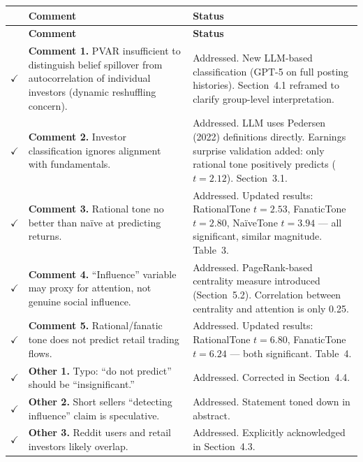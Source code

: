 \documentclass[11pt]{article}
\newcommand{\done}{\textcolor{done}{$\checkmark$}}
\begin{document}
\begin{longtable}{p{} p{} p{}}
\toprule
& \textbf{Comment} & \textbf{Status} \\
\midrule
\endfirsthead
\toprule
& \textbf{Comment} & \textbf{Status} \\
\midrule
\endhead
\bottomrule
\endfoot

\done & \textbf{Comment 1.} PVAR insufficient to distinguish belief spillover from autocorrelation of individual investors (dynamic reshuffling concern). &
  Addressed. New LLM-based classification (GPT-5 on full posting histories). Section~4.1 reframed to clarify group-level interpretation. \\[6pt]

\done & \textbf{Comment 2.} Investor classification ignores alignment with fundamentals. &
  Addressed. LLM uses Pedersen (2022) definitions directly. Earnings surprise validation added: only rational tone positively predicts ($t=2.12$). Section~3.1. \\[6pt]

\done & \textbf{Comment 3.} Rational tone no better than na\"{i}ve at predicting returns. &
  Addressed. Updated results: RationalTone $t=2.53$, FanaticTone $t=2.80$, Na\"{i}veTone $t=3.94$ --- all significant, similar magnitude. Table~3. \\[6pt]

\done & \textbf{Comment 4.} ``Influence'' variable may proxy for attention, not genuine social influence. &
  Addressed. PageRank-based centrality measure introduced (Section~5.2). Correlation between centrality and attention is only 0.25. \\[6pt]

\done & \textbf{Comment 5.} Rational/fanatic tone does not predict retail trading flows. &
  Addressed. Updated results: RationalTone $t=6.80$, FanaticTone $t=6.24$ --- both significant. Table~4. \\[6pt]

\done & \textbf{Other 1.} Typo: ``do not predict'' should be ``insignificant.'' &
  Addressed. Corrected in Section~4.4. \\[6pt]

\done & \textbf{Other 2.} Short sellers ``detecting influence'' claim is speculative. &
  Addressed. Statement toned down in abstract. \\[6pt]

\done & \textbf{Other 3.} Reddit users and retail investors likely overlap. &
  Addressed. Explicitly acknowledged in Section~4.3. \\

\end{longtable}
\end{document}
